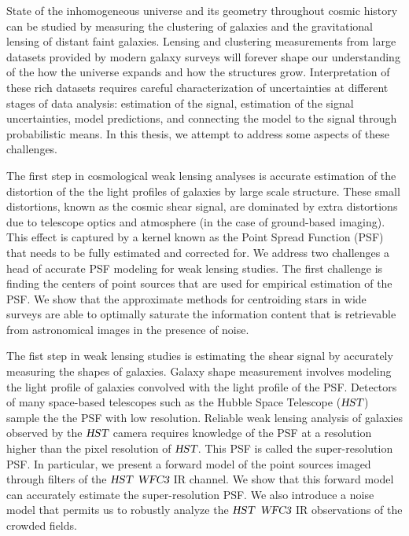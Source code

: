State of the inhomogeneous universe and its geometry throughout cosmic history can be studied by measuring the clustering of galaxies and the gravitational lensing of distant faint galaxies. Lensing and clustering measurements from large datasets provided by modern galaxy surveys will forever shape our understanding of the how the universe expands and how the structures grow. Interpretation of these rich datasets requires careful characterization of uncertainties at different stages of data analysis: estimation of the signal, estimation of the signal uncertainties, model predictions, and connecting the model to the signal through probabilistic means. In this thesis, we attempt to address some aspects of these challenges.  

The first step in cosmological weak lensing analyses is accurate estimation of the distortion of the the light profiles of galaxies by large scale structure. These small distortions, known as the cosmic shear signal, are dominated by extra distortions due to telescope optics and atmosphere (in the case of ground-based imaging). This effect is captured by a kernel known as the Point Spread Function (PSF) that needs to be fully estimated and corrected for. We address two challenges a head of accurate PSF modeling for weak lensing studies. The first challenge is finding the centers of point sources that are used for empirical estimation of the PSF. We show that the approximate methods for centroiding stars in wide surveys are able to optimally saturate the information content that is retrievable from astronomical images in the presence of noise. 

The fist step in weak lensing studies is estimating the shear signal by accurately measuring the shapes of galaxies. Galaxy shape measurement involves modeling the light profile of galaxies convolved with the light profile of the PSF. Detectors of many space-based telescopes such as the Hubble Space Telescope (${\textsl{HST}}$) sample the the PSF with low resolution. Reliable weak lensing analysis of galaxies observed by the ${\textsl{HST}}$ camera requires knowledge of the PSF at a resolution higher than the pixel resolution of ${\textsl{HST}}$. This PSF is called the super-resolution PSF. In particular, we present a forward model of the point sources imaged through filters of the ${\textsl{HST}}$ ${\textsl{WFC3}}$ IR channel. We show that this forward model can accurately estimate the super-resolution PSF. We also introduce a noise model that permits us to robustly analyze the ${\textsl{HST}}$ ${\textsl{WFC3}}$ IR observations of the crowded fields.    

